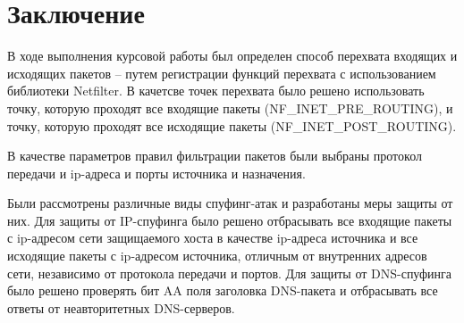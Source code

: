 \chapter*{Заключение}

В ходе выполнения курсовой работы был определен способ перехвата входящих и исходящих пакетов -- путем регистрации функций перехвата с использованием библиотеки Netfilter. В качетсве точек перехвата было решено использовать точку, которую проходят все входящие пакеты (NF\_INET\_PRE\_ROUTING), и точку, которую проходят все исходящие пакеты (NF\_INET\_POST\_ROUTING).

В качестве параметров правил фильтрации пакетов были выбраны протокол передачи и  ip-адреса и порты источника и назначения. 

Были рассмотрены различные виды спуфинг-атак и разработаны меры защиты от них. Для защиты от IP-спуфинга было решено отбрасывать все входящие пакеты с ip-адресом сети защищаемого хоста в качестве ip-адреса источника и все исходящие пакеты с ip-адресом источника, отличным от внутренних адресов сети, независимо от протокола передачи и портов. Для защиты от DNS-спуфинга было решено проверять бит AA поля заголовка DNS-пакета и отбрасывать все ответы от неавторитетных DNS-серверов. 

